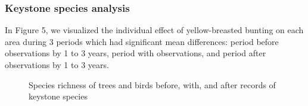 \documentclass{article}
\begin{document}
\subsubsection{Keystone species analysis}
In Figure 5, we visualized the individual effect of yellow-breasted bunting on each area during 3 periods which had significant mean differences: period before observations by 1 to 3 years, period with observations, and period after observations by 1 to 3 years.
\begin{figure}[h]
	\vspace*{-2mm}
	\centering
	\vspace*{-2mm}
	\caption{Species richness of trees and birds before, with, and after records of keystone species}
	\vspace*{-5mm}
\end{figure}
\end{document}
